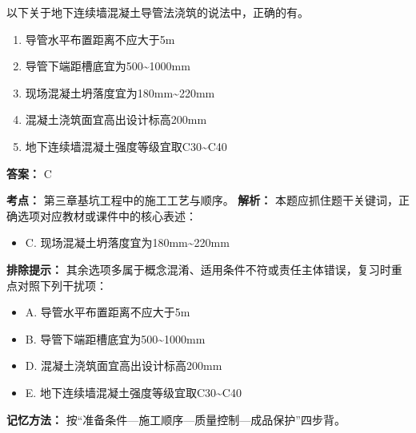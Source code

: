 \documentclass[UTF8,fontset=fandol,11pt]{ctexart}
\begin{document}
\begin{quizbox}[title={第 6 题}]
以下关于地下连续墙混凝土导管法浇筑的说法中，正确的有。\\
\begin{enumerate}[label=\Alph*.]
\item 导管水平布置距离不应大于5m
\item 导管下端距槽底宜为500\textasciitilde{}1000mm
\item 现场混凝土坍落度宜为180mm\textasciitilde{}220mm
\item 混凝土浇筑面宜高出设计标高200mm
\item 地下连续墙混凝土强度等级宜取C30\textasciitilde{}C40
\end{enumerate}
\textbf{答案：} C
\vspace{0.25em}
\begin{answerbox}[title={考点解析}]
\textbf{考点：} 第三章基坑工程中的施工工艺与顺序。
\textbf{解析：} 本题应抓住题干关键词，正确选项对应教材或课件中的核心表述：
\begin{itemize}
\item C. 现场混凝土坍落度宜为180mm\textasciitilde{}220mm
\end{itemize}
\textbf{排除提示：} 其余选项多属于概念混淆、适用条件不符或责任主体错误，复习时重点对照下列干扰项：
\begin{itemize}
\item A. 导管水平布置距离不应大于5m
\item B. 导管下端距槽底宜为500\textasciitilde{}1000mm
\item D. 混凝土浇筑面宜高出设计标高200mm
\item E. 地下连续墙混凝土强度等级宜取C30\textasciitilde{}C40
\end{itemize}
\textbf{记忆方法：} 按“准备条件—施工顺序—质量控制—成品保护”四步背。
\end{answerbox}
\end{quizbox}
\end{document}
